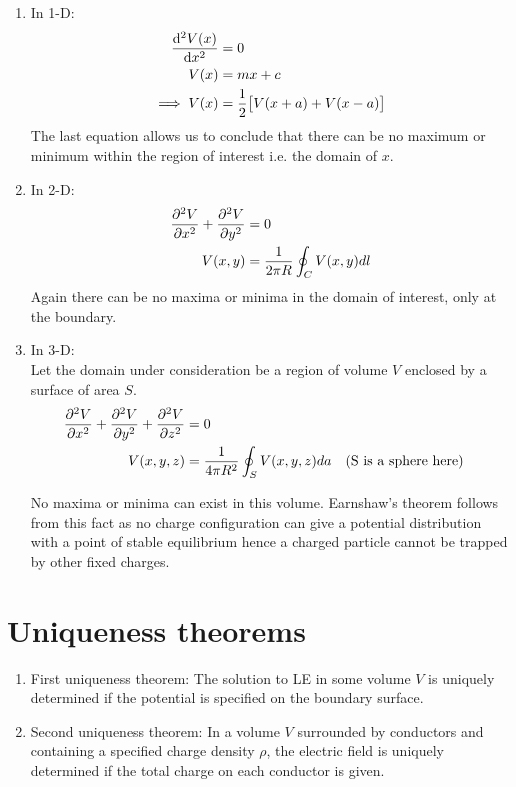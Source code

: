 \documentclass[12pt, oneside]{book}
\begin{document}
	\begin{enumerate}
		
		\item In 1-D:\\
		\begin{align}
			\dv[2]{V(x)}{x}&=0 \\
			           V(x)&=mx+c\\
			  \implies V(x)&=\frac{1}{2}\big[V(x+a)+V(x-a)\big]
		\end{align}
		The last equation allows us to conclude that there can be no maximum or minimum within the region of interest i.e. the domain of $x$. \\
		
		\item In 2-D:\\
		\begin{align}
			\pdv[2]{V}{x}+\pdv[2]{V}{y}&=0 \\
			                     V(x,y)&=\dfrac{1}{2\pi R}\oint_C V(x,y) dl
        \end{align}
		Again there can be no maxima or minima in the domain of interest, only at the boundary.
		
		\item In 3-D:\\
		Let the domain under consideration be a region of volume $V$ enclosed by a surface of area $S$.
		\begin{align}
			\pdv[2]{V}{x}+\pdv[2]{V}{y}+\pdv[2]{V}{z}&=0 \\
                                             V(x,y,z)&=\dfrac{1}{4\pi R^2}\oint_{S}V(x,y,z) da \qq{(S is a sphere here)}
		\end{align}

	No maxima or minima can exist in this volume. Earnshaw's theorem follows from this fact as no charge configuration can give a potential distribution with a point of stable equilibrium hence a charged particle cannot be trapped by other fixed charges.
	\end{enumerate}

\section{Uniqueness theorems}
\begin{tcolorbox}[colback=green!5, colframe=green!75!black, title=Theorems]
	\begin{enumerate}
		\item First uniqueness theorem: The solution to LE in some volume $V$ is uniquely determined if the potential is specified on the boundary surface.\\
		
		\item Second uniqueness theorem: In a volume $V$ surrounded by conductors and containing a specified charge density $\rho$, the electric field is uniquely determined if the total charge on each conductor is given.
	\end{enumerate}
\end{tcolorbox}
\end{document}

